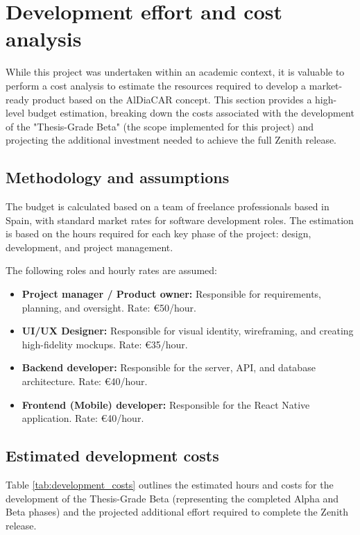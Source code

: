 \section{Development effort and cost analysis}

While this project was undertaken within an academic context, it is valuable to perform a cost analysis to estimate the resources required to develop a market-ready product based on the AlDiaCAR concept. This section provides a high-level budget estimation, breaking down the costs associated with the development of the "Thesis-Grade Beta" (the scope implemented for this project) and projecting the additional investment needed to achieve the full Zenith release.

\subsection{Methodology and assumptions}

The budget is calculated based on a team of freelance professionals based in Spain, with standard market rates for software development roles. The estimation is based on the hours required for each key phase of the project: design, development, and project management.

The following roles and hourly rates are assumed:
\begin{itemize}
\item \textbf{Project manager / Product owner:} Responsible for requirements, planning, and oversight. Rate: €50/hour.
\item \textbf{UI/UX Designer:} Responsible for visual identity, wireframing, and creating high-fidelity mockups. Rate: €35/hour.
\item \textbf{Backend developer:} Responsible for the server, API, and database architecture. Rate: €40/hour.
\item \textbf{Frontend (Mobile) developer:} Responsible for the React Native application. Rate: €40/hour.
\end{itemize}

\subsection{Estimated development costs}

Table \ref{tab:development_costs} outlines the estimated hours and costs for the development of the Thesis-Grade Beta (representing the completed Alpha and Beta phases) and the projected additional effort required to complete the Zenith release.


